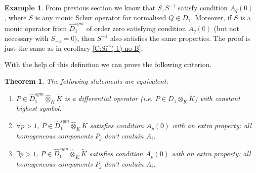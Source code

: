 \documentclass[11pt]{article}
\theoremstyle{definition}
\newtheorem{ex}{Example}[section]
\theoremstyle{plain}
\newtheorem{theorem}{Theorem}[section]
\numberwithin{equation}{section}
\begin{document}
\begin{ex}
\label{Ex:Schur_op}
From previous section we know that $S, S^{-1}$ satisfy condition $A_q(0)$, where $S$ is any monic Schur operator for normalised $Q\in D_1$. Moreover, if $S$ is a monic operator from $\hat{D}_1^{sym}$ of order zero satisfying condition $A_q(0)$ (but not necessary with $S_{-1}=0$), then $S^{-1}$ also satisfies the same properties. The proof is just the same as in corollary \ref{C:Si^(-1) no B}. 
\end{ex}

With the help of this definition we can prove the following criterion.  

\begin{theorem}
\label{T: P in hat(D) is a dif_op}
	The following statements are equivalent:
	\begin{enumerate}
		\item $P\in \hat{D}_1^{sym}\hat{\otimes}_K\tilde{K}$ is a {\it differential operator} (i.e. $P\in D_1\otimes_K\tilde{K}$)  with constant highest symbol.
		\item $\forall p>1$, $P\in \hat{D}_1^{sym}\hat{\otimes}_K\tilde{K}$ satisfies condition $A_p(0)$ with an extra property: all homogeneous components $P_j$ don't contain  $A_i$.
		\item $\exists p>1$, $P\in \hat{D}_1^{sym}\hat{\otimes}_K\tilde{K}$ satisfies condition $A_p(0)$ with an extra property: all homogeneous components $P_j$ don't contain  $A_i$.
	\end{enumerate}
\end{theorem}
\end{document}
